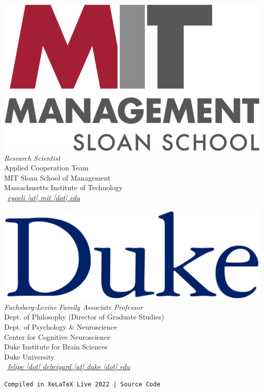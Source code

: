 \documentclass[10pt, a4paper, english]{cv_public}
\begin{document}
\begin{multicols}{2}
{}
\raggedright{
    \signature{\href{https://erezyoeli.com/}{Erez Yoeli, Ph.D.}} \includegraphics[scale=.015]{img/MIT_Sloan.png} \\
    \textsl{Research Scientist} \\
    Applied Cooperation Team \\
    MIT Sloan School of Management \\
    Massachusetts Institute of Technology  \\
    {\footnotesize \faEnvelope} \ \textit{\href{mailto:eyoli@mit.edu}{eyoeli [at] mit [dot] edu}} \\
}

\vspace{20pt}

\raggedright{
    \signature{\href{https://philosophy.duke.edu/people/felipe-de-brigard}{Felipe De Brigard, Ph.D.}} \includegraphics[scale=.1]{img/duke_wordmark_navyblue.png} \\
    \textsl{Fuchsberg-Levine Family Associate Professor} \\
    Dept. of Philosophy (Director of Graduate Studies) \\
    Dept. of Psychology \& Neuroscience \\
    Center for Cognitive Neuroscience \\
    Duke Institute for Brain Sciences \\
    Duke University \\
    {\footnotesize \faEnvelope} \ \textit{\href{mailto:felipe.debrigard@duke.edu}{felipe [dot] debrigard [at] duke [dot] edu}} \\
}
\end{multicols}

\vfill
\texttt{Compiled in Xe\LaTeX \ Live 2022 | Source Code \href{https://github.com/1nathanliang/cv_public}{\faExternalLink*}}
\end{document}
